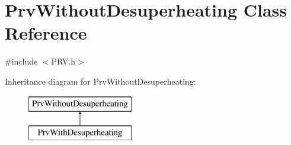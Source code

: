 \hypertarget{class_prv_without_desuperheating}{}\section{Prv\+Without\+Desuperheating Class Reference}
\label{class_prv_without_desuperheating}


{\ttfamily \#include $<$P\+R\+V.\+h$>$}

Inheritance diagram for Prv\+Without\+Desuperheating\+:\begin{figure}[H]
\begin{center}
\leavevmode
\includegraphics[height=2.000000cm]{db/db1/class_prv_without_desuperheating}
\end{center}
\end{figure}

